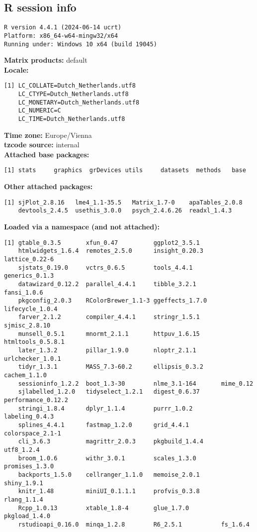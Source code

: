 \documentclass[output=paper,colorlinks,citecolor=brown]{langscibook}
\begin{document}
\begin{paperappendix}
\clearpage
\section{R session info}


\begin{verbatim}
R version 4.4.1 (2024-06-14 ucrt)
Platform: x86_64-w64-mingw32/x64
Running under: Windows 10 x64 (build 19045)
\end{verbatim}

\noindent
\textbf{Matrix products:} default\\
\textbf{Locale:}
\begin{verbatim}
[1] LC_COLLATE=Dutch_Netherlands.utf8
    LC_CTYPE=Dutch_Netherlands.utf8
    LC_MONETARY=Dutch_Netherlands.utf8
    LC_NUMERIC=C
    LC_TIME=Dutch_Netherlands.utf8
\end{verbatim}

\noindent
\textbf{Time zone:} Europe/Vienna\\
\textbf{tzcode source:} internal\\

\textbf{Attached base packages:}
\begin{verbatim}
[1] stats     graphics  grDevices utils     datasets  methods   base
\end{verbatim}

\textbf{Other attached packages:}
\begin{verbatim}
[1] sjPlot_2.8.16   lme4_1.1-35.5   Matrix_1.7-0    apaTables_2.0.8
    devtools_2.4.5  usethis_3.0.0   psych_2.4.6.26  readxl_1.4.3
\end{verbatim}

\textbf{Loaded via a namespace (and not attached):}
{\small
\begin{verbatim}
[1] gtable_0.3.5       xfun_0.47          ggplot2_3.5.1
    htmlwidgets_1.6.4  remotes_2.5.0      insight_0.20.3     lattice_0.22-6
    sjstats_0.19.0     vctrs_0.6.5        tools_4.4.1        generics_0.1.3
    datawizard_0.12.2  parallel_4.4.1     tibble_3.2.1       fansi_1.0.6
    pkgconfig_2.0.3    RColorBrewer_1.1-3 ggeffects_1.7.0    lifecycle_1.0.4
    farver_2.1.2       compiler_4.4.1     stringr_1.5.1      sjmisc_2.8.10
    munsell_0.5.1      mnormt_2.1.1       httpuv_1.6.15      htmltools_0.5.8.1
    later_1.3.2        pillar_1.9.0       nloptr_2.1.1       urlchecker_1.0.1
    tidyr_1.3.1        MASS_7.3-60.2      ellipsis_0.3.2     cachem_1.1.0
    sessioninfo_1.2.2  boot_1.3-30        nlme_3.1-164       mime_0.12
    sjlabelled_1.2.0   tidyselect_1.2.1   digest_0.6.37      performance_0.12.2
    stringi_1.8.4      dplyr_1.1.4        purrr_1.0.2        labeling_0.4.3
    splines_4.4.1      fastmap_1.2.0      grid_4.4.1         colorspace_2.1-1
    cli_3.6.3          magrittr_2.0.3     pkgbuild_1.4.4     utf8_1.2.4
    broom_1.0.6        withr_3.0.1        scales_1.3.0       promises_1.3.0
    backports_1.5.0    cellranger_1.1.0   memoise_2.0.1      shiny_1.9.1
    knitr_1.48         miniUI_0.1.1.1     profvis_0.3.8      rlang_1.1.4
    Rcpp_1.0.13        xtable_1.8-4       glue_1.7.0         pkgload_1.4.0
    rstudioapi_0.16.0  minqa_1.2.8        R6_2.5.1           fs_1.6.4
\end{verbatim}
}
\end{paperappendix}
\end{document}

